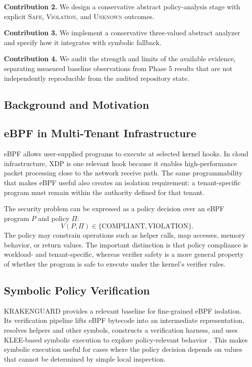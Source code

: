 \documentclass[12pt,a4paper]{article}
\begin{document}
\noindent\textbf{Contribution 2.} We design a conservative abstract policy-analysis stage with explicit \textsc{Safe}, \textsc{Violation}, and \textsc{Unknown} outcomes.

\noindent\textbf{Contribution 3.} We implement a conservative three-valued abstract analyzer and specify how it integrates with symbolic fallback.

\noindent\textbf{Contribution 4.} We audit the strength and limits of the available evidence, separating measured baseline observations from Phase 5 results that are not independently reproducible from the audited repository state.

\subsection{Background and Motivation}

\subsection{eBPF in Multi-Tenant Infrastructure}

eBPF allows user-supplied programs to execute at selected kernel hooks. In cloud infrastructure, XDP is one relevant hook because it enables high-performance packet processing close to the network receive path. The same programmability that makes eBPF useful also creates an isolation requirement: a tenant-specific program must remain within the authority defined for that tenant.

The security problem can be expressed as a policy decision over an eBPF program $P$ and policy $\Pi$:
\[
    V(P,\Pi) \in \{\mathrm{COMPLIANT},\mathrm{VIOLATION}\}.
\]
The policy may constrain operations such as helper calls, map accesses, memory behavior, or return values. The important distinction is that policy compliance is workload- and tenant-specific, whereas verifier safety is a more general property of whether the program is safe to execute under the kernel's verifier rules.

\subsection{Symbolic Policy Verification}

KRAKENGUARD provides a relevant baseline for fine-grained eBPF isolation. Its verification pipeline lifts eBPF bytecode into an intermediate representation, resolves helpers and other symbols, constructs a verification harness, and uses KLEE-based symbolic execution to explore policy-relevant behavior \citep{patel2026krakenguard}. This makes symbolic execution useful for cases where the policy decision depends on values that cannot be determined by simple local inspection.
\end{document}
